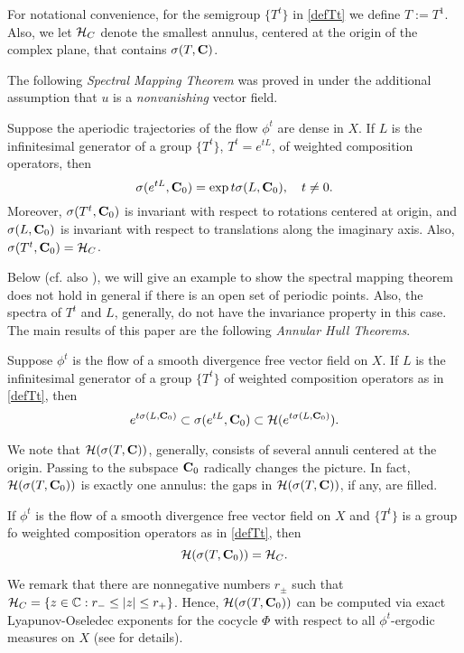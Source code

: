 For notational convenience, for the semigroup $\{T^t\}$ in
\eqref{defTt} we define $T:=T^1$. Also, we let
${\cal{H}}_C$ denote the smallest  annulus, centered
at the origin of the complex plane, that contains $\sigma(T,{\bold C})$.

The following {\em Spectral Mapping Theorem}
was proved in \cite{clms} under the additional assumption
that $u$ is a {\em nonvanishing} vector field. 
\begin{thm} 
Suppose   
the aperiodic trajectories of the flow $\phi^t$ are dense in $X$. 
If $L$ is the infinitesimal generator of a group $\{T^t\}$, 
$T^t=e^{tL}$, of weighted composition operators,  then
\[
\sigma(e^{tL},{{\bold C}_0}) = \exp t\sigma (L,{{\bold C}_0}),\quad t\neq 0.
\]
Moreover, $\sigma(T^t,{{\bold C}_0})$ is invariant with respect to
rotations centered at origin, and $\sigma(L, {{\bold C}_0})$ is
invariant with respect to translations along the imaginary axis.
Also, $\sigma(T^t, {{\bold C}_0})={\cal{H}}_C$.
\end{thm}

Below (cf. also \cite{CS}), we will give an example to show
the spectral mapping theorem does not hold in general if there
is an open set of periodic points. Also, the spectra of $T^t$ and $L$, 
generally, do not have the invariance property in this case.
The main results of this paper are the following 
{\em Annular Hull Theorems}. 
\begin{thm}   
Suppose  $\phi^t$ is the flow of a 
smooth divergence free vector field on $X$. 
If $L$ is the infinitesimal generator of a group $\{T^t\}$ of weighted
composition operators as in \eqref{defTt}, then
\[
e^{t\sigma(L,{{\bold C}_0})}\subset \sigma (e^{tL},{{\bold C}_0}) \subset 
 {\cal{H}} (e^{t\sigma (L,{{\bold C}_0})}).
\]
\end{thm}
\noindent We note that ${\cal{H}}(\sigma(T, {\bold C}))$, generally,
consists of several annuli centered at the origin.
Passing to the subspace ${{\bold C}_0}$ radically changes the picture. In fact,
${\cal{H}}(\sigma(T, {{\bold C}_0}))$ is exactly one annulus: the gaps
in ${\cal{H}}(\sigma(T, {\bold C}))$, if any, are filled.
\begin{thm}
If $\phi^t$ is the flow of a 
smooth divergence free vector field on $X$ and $\{T^t\}$ is
a group fo weighted composition operators as in \eqref{defTt},
then
\begin{equation}\lb{spechul}
\calH(\sig(T, \cnd))=\calH_C.
\end{equation}
\end{thm}
\noindent We remark  that there are nonnegative  numbers $r_{\pm}$ 
such that
${\cal{H}}_C=\{z\in{\Bbb{C}}: r_- \leq|z| \leq r_+\}$.
Hence, ${\cal{H}}(\sigma(T,{{\bold C}_0}))$
can be computed via exact Lyapunov-Oseledec
exponents for the cocycle $\Phi$
with respect to all 
$\phi^t$-ergodic measures on $X$ (see \cite{clms,LS} for details).

